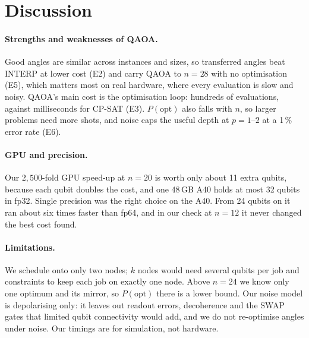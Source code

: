 
\section{Discussion}
\label{sec:discussion}

\paragraph{Strengths and weaknesses of QAOA.}
Good angles are similar across instances and sizes, so transferred angles beat INTERP at lower cost (E2) and carry QAOA to $n = 28$ with no optimisation (E5), which matters most on real hardware, where every evaluation is slow and noisy.
QAOA's main cost is the optimisation loop: hundreds of evaluations, against milliseconds for CP-SAT (E3).
$P(\text{opt})$ also falls with $n$, so larger problems need more shots, and noise caps the useful depth at $p = 1$--$2$ at a 1\,\% error rate (E6).

\paragraph{GPU and precision.}
Our $2{,}500$-fold GPU speed-up at $n = 20$ is worth only about 11 extra qubits, because each qubit doubles the cost, and one 48\,GB A40 holds at most 32 qubits in fp32.
Single precision was the right choice on the A40.
From 24 qubits on it ran about six times faster than fp64, and in our check at $n = 12$ it never changed the best cost found.

\paragraph{Limitations.}
We schedule onto only two nodes; $k$ nodes would need several qubits per job and constraints to keep each job on exactly one node.
Above $n = 24$ we know only one optimum and its mirror, so $P(\text{opt})$ there is a lower bound.
Our noise model is depolarising only: it leaves out readout errors, decoherence and the SWAP gates that limited qubit connectivity would add, and we do not re-optimise angles under noise.
Our timings are for simulation, not hardware.
